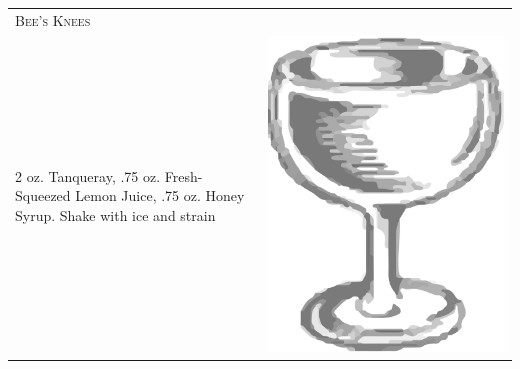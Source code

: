 \documentclass{article}
\begin{document}
\begin{tabular}{p{2in} p{0.5in}}
\multicolumn{2}{p{3in}}{\centering\Huge\textsc{Bee's Knees}}\\ 
  \vspace{-0.1in}2 oz. Tanqueray, .75 oz. Fresh-Squeezed Lemon Juice, .75 oz. Honey Syrup. Shake with ice and strain&
  \vspace{-0.1in} \includegraphics{coupe.png}
\end{tabular}
\end{document}

